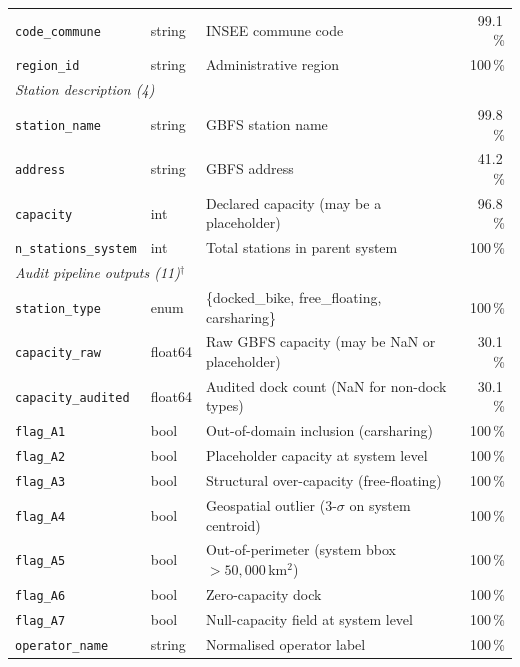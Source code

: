 \documentclass[11pt,a4paper]{article}
\begin{document}
{\begin{longtable}{@{}lllr@{}}
\quad\texttt{code\_commune}      & string  & INSEE commune code                        & 99.1\,\%\\
\quad\texttt{region\_id}         & string  & Administrative region                     & 100\,\%\\
\midrule
\multicolumn{4}{l}{\textit{Station description (4)}}\\
\quad\texttt{station\_name}      & string  & GBFS station name                         & 99.8\,\%\\
\quad\texttt{address}            & string  & GBFS address                              & 41.2\,\%\\
\quad\texttt{capacity}           & int     & Declared capacity (may be a placeholder)   & 96.8\,\%\\
\quad\texttt{n\_stations\_system}& int     & Total stations in parent system            & 100\,\%\\
\midrule
\multicolumn{4}{l}{\textit{Audit pipeline outputs (11)$^\dag$}}\\
\quad\texttt{station\_type}      & enum    & \{docked\_bike, free\_floating, carsharing\} & 100\,\%\\
\quad\texttt{capacity\_raw}      & float64 & Raw GBFS capacity (may be NaN or placeholder) & 30.1\,\%\\
\quad\texttt{capacity\_audited}  & float64 & Audited dock count (NaN for non-dock types)   & 30.1\,\%\\
\quad\texttt{flag\_A1}            & bool    & Out-of-domain inclusion (carsharing)          & 100\,\%\\
\quad\texttt{flag\_A2}            & bool    & Placeholder capacity at system level          & 100\,\%\\
\quad\texttt{flag\_A3}            & bool    & Structural over-capacity (free-floating)      & 100\,\%\\
\quad\texttt{flag\_A4}            & bool    & Geospatial outlier (3-$\sigma$ on system centroid) & 100\,\%\\
\quad\texttt{flag\_A5}            & bool    & Out-of-perimeter (system bbox $> 50{,}000$\,km$^2$) & 100\,\%\\
\quad\texttt{flag\_A6}            & bool    & Zero-capacity dock                            & 100\,\%\\
\quad\texttt{flag\_A7}            & bool    & Null-capacity field at system level           & 100\,\%\\
\quad\texttt{operator\_name}     & string  & Normalised operator label                     & 100\,\%\\

\end{longtable}}
\end{document}
